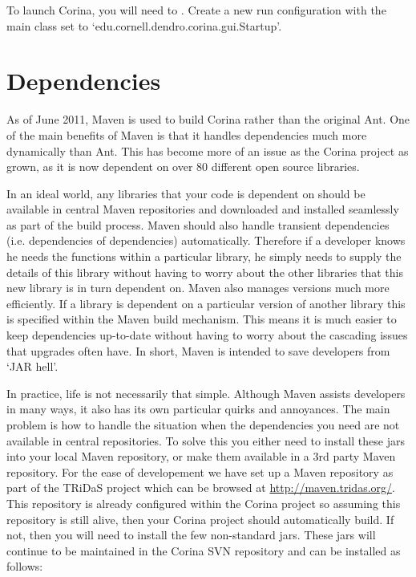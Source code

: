 To launch Corina, you will need to .  Create a new run configuration with the main class set to `edu.cornell.dendro.corina.gui.Startup'.     


\section{Dependencies}
\label{txt:DependenciesDesktopClient}
As of June 2011, Maven is used to build Corina rather than the original Ant.  One of the main benefits of Maven is that it handles dependencies much more dynamically than Ant.  This has become more of an issue as the Corina project as grown, as it is now dependent on over 80 different open source libraries.  

In an ideal world, any libraries that your code is dependent on should be available in central Maven repositories and downloaded and installed seamlessly as part of the build process.  Maven should also handle transient dependencies (i.e. dependencies of dependencies) automatically.  Therefore if a developer knows he needs the functions within a particular library, he simply needs to supply the details of this library without having to worry about the other libraries that this new library is in turn dependent on.  Maven also manages versions much more efficiently.  If a library is dependent on a particular version of another library this is specified within the Maven build mechanism.  This means it is much easier to keep dependencies up-to-date without having to worry about the cascading issues that upgrades often have.  In short, Maven is intended to save developers from `JAR hell'.

In practice, life is not necessarily that simple.  Although Maven assists developers in many ways, it also has its own particular quirks and annoyances.  The main problem is how to handle the situation when the dependencies you need are not available in central repositories.  To solve this you either need to install these jars into your local Maven repository, or make them available in a 3rd party Maven repository.  For the ease of developement we have set up a Maven repository as part of the TRiDaS project which can be browsed at \url{http://maven.tridas.org/}.  This repository is already configured within the Corina project so assuming this repository is still alive, then your Corina project should automatically build.  If not, then you will need to install the few non-standard jars.  These jars will continue to be maintained in the Corina SVN repository and can be installed as follows:


